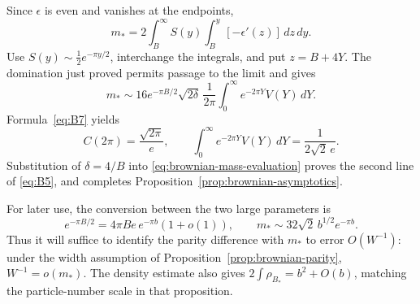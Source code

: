 Since $\epsilon$ is even and vanishes at the endpoints,
\[
 m_*=2\int_B^\infty S(y)
                      \int_B^y[-\epsilon'(z)]\,dz\,dy.
\]
Use $S(y)\sim\frac12e^{-\pi y/2}$, interchange the integrals, and put
$z=B+4Y$.  The domination just proved permits passage to the limit and
gives
\begin{equation}
 m_*\sim16e^{-\pi B/2}\sqrt{2\delta}\,
                \frac1{2\pi}\int_0^\infty e^{-2\pi Y}V(Y)\,dY.
 \label{eq:brownian-mass-evaluation}
\end{equation}
Formula~\eqref{eq:B7} yields
\[
 C(2\pi)=\frac{\sqrt{2\pi}}e,
 \qquad
 \int_0^\infty e^{-2\pi Y}V(Y)\,dY=\frac1{2\sqrt2\,e}.
\]
Substitution of $\delta=4/B$ into
\eqref{eq:brownian-mass-evaluation} proves the second line of
\eqref{eq:B5}, and completes Proposition~\ref{prop:brownian-asymptotics}.

For later use, the conversion between the two large parameters is
\[
 e^{-\pi B/2}=4\pi B e\,e^{-\pi b}(1+o(1)),
 \qquad
 m_*\sim32\sqrt2\,b^{1/2}e^{-\pi b}.
\]
Thus it will suffice to identify the parity difference with $m_*$ to
error $O(W^{-1})$: under the width assumption of
Proposition~\ref{prop:brownian-parity}, $W^{-1}=o(m_*)$.
The density estimate also gives $2\int\rho_{B_*}=b^2+O(b)$, matching the
particle-number scale in that proposition.
